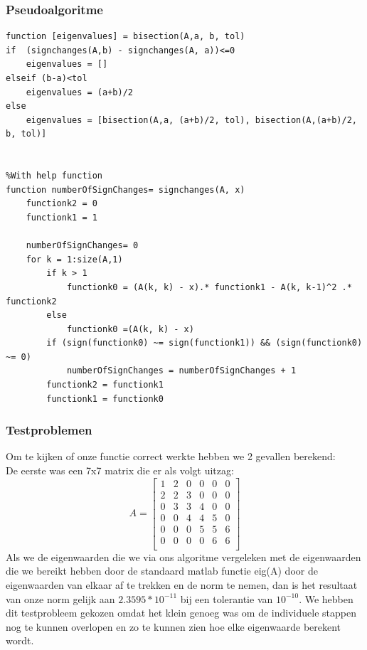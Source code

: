 \documentclass[a4paper]{article}
\begin{document}
\subsubsection{Pseudoalgoritme}
\begin{verbatim}
function [eigenvalues] = bisection(A,a, b, tol)
if  (signchanges(A,b) - signchanges(A, a))<=0
    eigenvalues = []
elseif (b-a)<tol
    eigenvalues = (a+b)/2
else
    eigenvalues = [bisection(A,a, (a+b)/2, tol), bisection(A,(a+b)/2, b, tol)]


%With help function
function numberOfSignChanges= signchanges(A, x)
    functionk2 = 0
    functionk1 = 1

    numberOfSignChanges= 0
    for k = 1:size(A,1)
        if k > 1
            functionk0 = (A(k, k) - x).* functionk1 - A(k, k-1)^2 .* functionk2         
        else
            functionk0 =(A(k, k) - x)
        if (sign(functionk0) ~= sign(functionk1)) && (sign(functionk0) ~= 0)
            numberOfSignChanges = numberOfSignChanges + 1
        functionk2 = functionk1
        functionk1 = functionk0

\end{verbatim}
\subsubsection{Testproblemen}
Om te kijken of onze functie correct werkte hebben we 2 gevallen berekend:\\
De eerste was een 7x7 matrix die er als volgt uitzag:
\begin{equation}
A =
		\begin{bmatrix*}
			1 & 2 & 0 & 0 & 0 & 0 \\
			2 & 2 & 3 & 0 & 0 & 0 \\
			0 & 3 & 3 & 4 & 0 & 0 \\
			0 & 0 & 4 & 4 & 5 & 0\\
			0 & 0 & 0 & 5 & 5 & 6\\
			0 & 0 & 0 & 0 & 6 & 6\\
			 
		\end{bmatrix*}
\end{equation}
Als we de eigenwaarden die we via ons algoritme vergeleken met de eigenwaarden die we bereikt hebben door de standaard matlab functie eig(A) door de eigenwaarden van elkaar af te trekken en de norm te nemen, dan is het resultaat van onze norm gelijk aan $2.3595*10^{-11}$ bij een tolerantie van $10^{-10}$. We hebben dit testprobleem gekozen omdat het klein genoeg was om de individuele stappen nog te kunnen overlopen en zo te kunnen zien hoe elke eigenwaarde berekent wordt.\\
\end{document}
